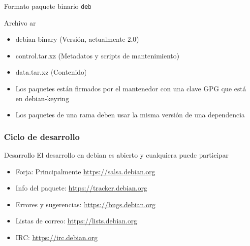 \documentclass{beamer}
\begin{document}
\begin{frame}{Formato paquete binario \texttt{deb}}
  \begin{block}{Archivo ar}
    \begin{itemize}
    \item debian-binary (Versión, actualmente 2.0)
    \item control.tar.xz (Metadatos y scripts de mantenimiento)
    \item data.tar.xz (Contenido)
    \end{itemize}
  \end{block}
  \begin{itemize}
  \item Los paquetes están firmados por el mantenedor con una clave
    GPG que está en debian-keyring
  \item Los paquetes de una rama deben usar la misma versión de una
    dependencia
  \end{itemize}
\end{frame}

\begin{frame}\frametitle{Ciclo de desarrollo}
  \begin{block}{Desarrollo}
  El desarrollo en debian es abierto y cualquiera puede participar
  \end{block}  
\begin{itemize}
\item Forja: Principalmente \url{https://salsa.debian.org}
\item Info del paquete: \url{https://tracker.debian.org}
\item Errores y sugerencias: \url{https://bugs.debian.org}
\item Listas de correo: \url{https://lists.debian.org}
\item IRC: \url{https://irc.debian.org}
\end{itemize}
\end{frame}
\end{document}
